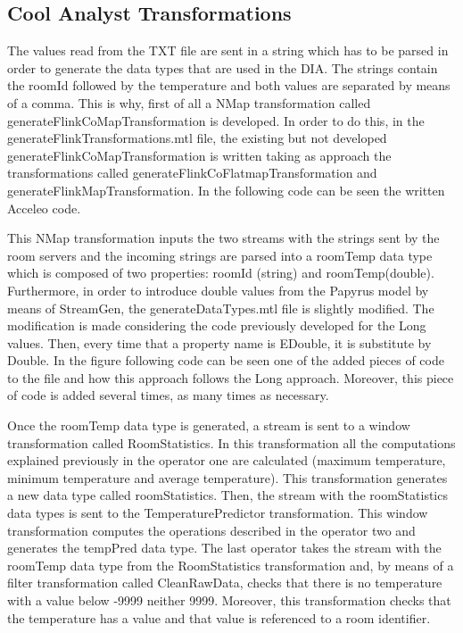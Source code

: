 \subsection{Cool Analyst Transformations}

The values read from the TXT file are sent in a string which has to be parsed in order to generate the data types that are used in the DIA. The strings contain the roomId followed by the temperature and both values are separated by means of a comma. This is why, first of all a NMap transformation called generateFlinkCoMapTransformation is developed. In order to do this, in the generateFlinkTransformations.mtl file, the existing but not developed generateFlinkCoMapTransformation is written taking as approach the transformations called generateFlinkCoFlatmapTransformation and generateFlinkMapTransformation. In the following code can be seen the written Acceleo code.



This NMap transformation inputs the two streams with the strings sent by the room servers and the incoming strings are parsed into a roomTemp data type which is composed of two properties: roomId (string) and roomTemp(double). Furthermore, in order to introduce double values from the Papyrus model by means of StreamGen, the generateDataTypes.mtl file is slightly modified. The modification is made considering the code previously developed for the Long values. Then, every time that a property name is EDouble, it is substitute by Double. In the figure following code can be seen one of the added pieces of code to the file and how this approach follows the Long approach. Moreover, this piece of code is added several times, as many times as necessary.



Once the roomTemp data type is generated, a stream is sent to a window transformation called RoomStatistics. In this transformation all the computations explained previously in the operator one are calculated (maximum temperature, minimum temperature and average temperature). This transformation generates a new data type called roomStatistics. Then, the stream with the roomStatistics data types is sent to the TemperaturePredictor transformation. This window transformation computes the operations described in the operator two and generates the tempPred data type. The last operator takes the stream with the roomTemp data type from the RoomStatistics transformation and, by means of a filter transformation called CleanRawData, checks that there is no temperature with a value below -9999 neither 9999. Moreover, this transformation checks that the temperature has a value and that value is referenced to a room identifier.

